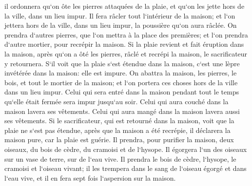 \verse il ordonnera qu`on ôte les pierres attaquées de la plaie, et qu`on les jette hors de la ville, dans un lieu impur. 
\verse Il fera râcler tout l`intérieur de la maison; et l`on jettera hors de la ville, dans un lieu impur, la poussière qu`on aura râclée. 
\verse On prendra d`autres pierres, que l`on mettra à la place des premières; et l`on prendra d`autre mortier, pour recrépir la maison. 
\verse Si la plaie revient et fait éruption dans la maison, après qu`on a ôté les pierres, râclé et recrépi la maison, 
\verse le sacrificateur y retournera. S`il voit que la plaie s`est étendue dans la maison, c`est une lèpre invétérée dans la maison: elle est impure. 
\verse On abattra la maison, les pierres, le bois, et tout le mortier de la maison; et l`on portera ces choses hors de la ville dans un lieu impur. 
\verse Celui qui sera entré dans la maison pendant tout le temps qu`elle était fermée sera impur jusqu`au soir. 
\verse Celui qui aura couché dans la maison lavera ses vêtements. Celui qui aura mangé dans la maison lavera aussi ses vêtements. 
\verse Si le sacrificateur, qui est retourné dans la maison, voit que la plaie ne s`est pas étendue, après que la maison a été recrépie, il déclarera la maison pure, car la plaie est guérie. 
\verse Il prendra, pour purifier la maison, deux oiseaux, du bois de cèdre, du cramoisi et de l`hysope. 
\verse Il égorgera l`un des oiseaux sur un vase de terre, sur de l`eau vive. 
\verse Il prendra le bois de cèdre, l`hysope, le cramoisi et l`oiseau vivant; il les trempera dans le sang de l`oiseau égorgé et dans l`eau vive, et il en fera sept fois l`aspersion sur la maison. 
